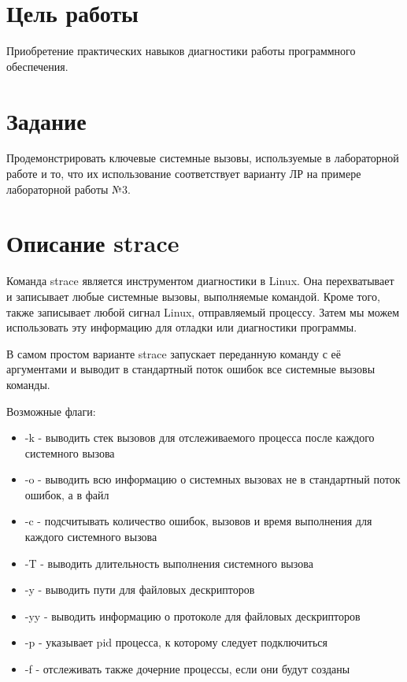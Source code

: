 \documentclass[a4paper, 12pt]{article}
\begin{document}
\section{Цель работы}
Приобретение практических навыков диагностики работы программного обеспечения.

\section{Задание}
Продемонстрировать ключевые 
системные вызовы, используемые в лабораторной работе и то, что их использование соответствует варианту ЛР на примере лабораторной работы №3.

\section{Описание strace}
 Команда strace является инструментом диагностики в Linux. Она перехватывает и записывает любые системные вызовы, выполняемые командой. Кроме того, также записывает любой сигнал Linux, отправляемый процессу. Затем мы можем использовать эту информацию для отладки или диагностики программы.

В самом простом варианте strace запускает переданную команду с её аргументами и выводит в стандартный поток ошибок все системные вызовы команды.

Возможные флаги:
\begin{itemize}
    \item -k - выводить стек вызовов для отслеживаемого процесса после каждого системного вызова
    \item -o - выводить всю информацию о системных вызовах не в стандартный поток ошибок, а в файл
    \item -c - подсчитывать количество ошибок, вызовов и время выполнения для каждого системного вызова
    \item -T - выводить длительность выполнения системного вызова
    \item -y - выводить пути для файловых дескрипторов
    \item -yy - выводить информацию о протоколе для файловых дескрипторов
    \item -p - указывает pid процесса, к которому следует подключиться
    \item -f - отслеживать также дочерние процессы, если они будут созданы
\end {itemize}


\newpage
\end{document}
